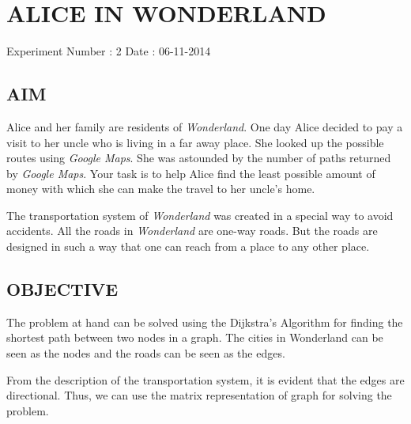 \section{ALICE IN WONDERLAND}
    Experiment Number : 2 \hfill Date : 06-11-2014
	
    \subsection{AIM}
		\par Alice and her family are residents of \emph{Wonderland}. One day Alice decided to pay a visit to her uncle who is living in a far away place. She looked up the possible routes using \emph{Google Maps}. She was astounded by the number of paths returned by \emph{Google Maps}. Your task is to help Alice find the least possible amount of money with which she can make the travel to her uncle's home.
		\par The transportation system of \emph{Wonderland} was created in a special way to avoid accidents. All the roads in \emph{Wonderland} are one-way roads. But the roads are designed in such a way that one can reach from a place to any other place.
		
	\subsection{OBJECTIVE}
		\par The problem at hand can be solved using the Dijkstra's Algorithm for finding the shortest path between two nodes in a graph. The cities in Wonderland can be seen as the nodes and the roads can be seen as the edges.
		\par From the description of the transportation system, it is evident that the edges are directional. Thus, we can use the matrix representation of graph for solving the problem.
		
